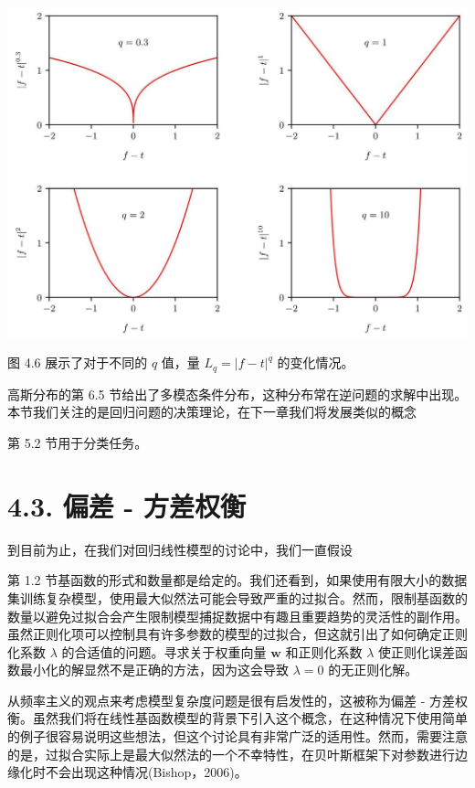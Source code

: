 \documentclass[10pt]{article}
\begin{document}
\begin{center}
\includegraphics[max width=1.0\textwidth]{images/0194e279-9b28-703a-88f4-c3ac21e2010d_142_232_345_1321_946_0.jpg}
\end{center}
\hspace*{3em} 

图 4.6 展示了对于不同的 \(q\) 值，量 \({L}_{q} = {\left| f - t\right| }^{q}\) 的变化情况。

高斯分布的第 6.5 节给出了多模态条件分布，这种分布常在逆问题的求解中出现。本节我们关注的是回归问题的决策理论，在下一章我们将发展类似的概念

第 5.2 节用于分类任务。

\section*{4.3. 偏差 - 方差权衡}

到目前为止，在我们对回归线性模型的讨论中，我们一直假设

第 1.2 节基函数的形式和数量都是给定的。我们还看到，如果使用有限大小的数据集训练复杂模型，使用最大似然法可能会导致严重的过拟合。然而，限制基函数的数量以避免过拟合会产生限制模型捕捉数据中有趣且重要趋势的灵活性的副作用。虽然正则化项可以控制具有许多参数的模型的过拟合，但这就引出了如何确定正则化系数 \(\lambda\) 的合适值的问题。寻求关于权重向量 \(\mathbf{w}\) 和正则化系数 \(\lambda\) 使正则化误差函数最小化的解显然不是正确的方法，因为这会导致 \(\lambda  = 0\) 的无正则化解。

从频率主义的观点来考虑模型复杂度问题是很有启发性的，这被称为偏差 - 方差权衡。虽然我们将在线性基函数模型的背景下引入这个概念，在这种情况下使用简单的例子很容易说明这些想法，但这个讨论具有非常广泛的适用性。然而，需要注意的是，过拟合实际上是最大似然法的一个不幸特性，在贝叶斯框架下对参数进行边缘化时不会出现这种情况(Bishop，2006)。
\end{document}
